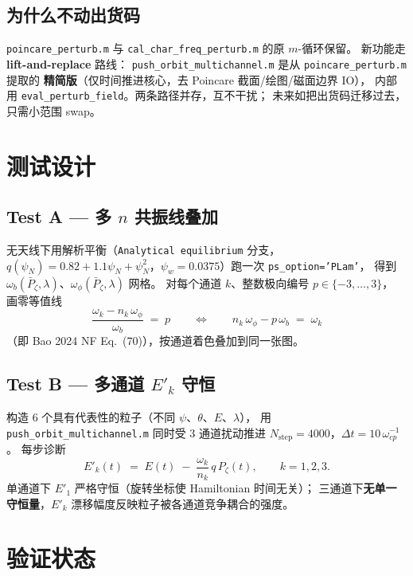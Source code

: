 \documentclass[11pt,a4paper]{article}
\begin{document}
\subsection{为什么不动出货码}

\texttt{poincare\_perturb.m} 与 \texttt{cal\_char\_freq\_perturb.m} 的原 $m$-循环保留。
新功能走 \textbf{lift-and-replace} 路线：
\texttt{push\_orbit\_multichannel.m} 是从 \texttt{poincare\_perturb.m} 提取的
\textbf{精简版}（仅时间推进核心，去 Poincare 截面/绘图/磁面边界 IO），
内部用 \texttt{eval\_perturb\_field}。两条路径并存，互不干扰；
未来如把出货码迁移过去，只需小范围 swap。

\section{测试设计}

\subsection{Test A — 多 \texorpdfstring{$n$}{n} 共振线叠加}

无天线下用解析平衡（\texttt{Analytical equilibrium} 分支，
$q(\psi_N)=0.82+1.1\psi_N+\psi_N^2$，$\psi_w=0.0375$）跑一次 \texttt{ps\_option='PLam'}，
得到 $\omega_b(\bar P_\zeta,\lambda)$、$\omega_\phi(\bar P_\zeta,\lambda)$ 网格。
对每个通道 $k$、整数极向编号 $p\in\{-3,\dots,3\}$，
画零等值线
\[
  \frac{\omega_k - n_k\,\omega_\phi}{\omega_b} \;=\; p
  \qquad\Longleftrightarrow\qquad
  n_k\,\omega_\phi - p\,\omega_b \;=\; \omega_k
\]
（即 Bao 2024 NF Eq.~(70)），按通道着色叠加到同一张图。

\subsection{Test B — 多通道 \texorpdfstring{$E'_k$}{E\_k} 守恒}

构造 6 个具有代表性的粒子（不同 $\psi$、$\theta$、$E$、$\lambda$），
用 \texttt{push\_orbit\_multichannel.m} 同时受 3 通道扰动推进
$N_{\text{step}}=4000$，$\Delta t = 10\,\omega_{cp}^{-1}$。
每步诊断
\[
  E'_k(t) \;=\; E(t) \;-\; \frac{\omega_k}{n_k}\,q\,P_\zeta(t),
  \qquad k=1,2,3.
\]
单通道下 $E'_1$ 严格守恒（旋转坐标使 Hamiltonian 时间无关）；
三通道下\textbf{无单一守恒量}，$E'_k$ 漂移幅度反映粒子被各通道竞争耦合的强度。

\section{验证状态}
\end{document}
